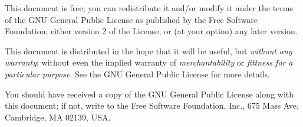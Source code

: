 \documentclass[11pt,a4paper,twoside]{book}
\begin{document}
  

\frontmatter

\maketitle

\begin{small} 
  This document is free; you can redistribute it and/or modify it
  under the terms of the GNU General Public License as published by
  the Free Software Foundation; either version 2 of the License, or
  (at your option) any later version.
 \vspace{0.5cm}
 
  This document is distributed in the hope that it will be useful, but
  \emph{without any warranty}; without even the implied warranty of
  \emph{merchantability} or \emph{fittness for a particular purpose}\@.  See the GNU
  General Public License for more details.
 \vspace{0.5cm} 
 
  You should have received a copy of the GNU General Public License
  along with this document; if not, write to the Free Software
  Foundation, Inc., 675 Mass Ave, Cambridge, MA 02139, USA.

\end{small}


\tableofcontents

\mainmatter



\end{document}
